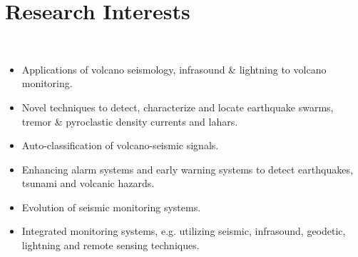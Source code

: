 \documentclass[margin,line]{res}
\begin{document}
\begin{resume}
\begin{itemize}
\end{itemize}

\section{\sc Research Interests}
\hline
\\
\begin{itemize}
\item Applications of volcano seismology, infrasound \& lightning to volcano monitoring.
\item Novel techniques to detect, characterize and locate earthquake swarms, tremor \& pyroclastic density currents and lahars.
\item Auto-classification of volcano-seismic signals.
\item Enhancing alarm systems and early warning systems to detect earthquakes, tsunami and volcanic hazards.
\item Evolution of seismic monitoring systems.
\item Integrated monitoring systems, e.g. utilizing seismic, infrasound, geodetic, lightning and remote sensing techniques.
\end{itemize}

\begin{comment}
\section{\sc Teaching Areas}
\hline
\begin{itemize}
\item Volcano Seismology
\item Volcano Monitoring
\item Computer Programming (in MATLAB, Python, Perl or C)
\item Unix \& shell scripting
\item Seismic Data Analysis
\item Time Series Analysis
\item Digital Signal Processing
\end{itemize}
\end{comment}


\end{resume}
\end{document}
